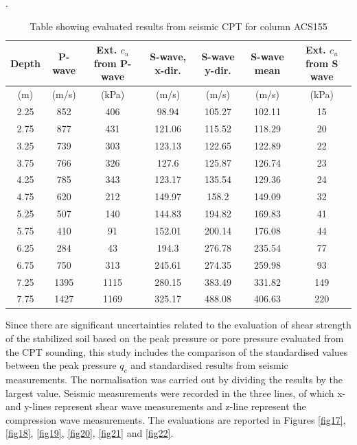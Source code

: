 \documentclass[final,3p,times,onecolumn,authoryear]{elsarticle}
\begin{document}
\begin{table}[t]
  \caption{Table showing evaluated results from seismic CPT for column ACS155}.
  \centering
  \begin{tabular}{| c c c c c c c |}                         
    Depth & P-wave & Ext. $c_u$ from P-wave & S-wave, x-dir. & S-wave y-dir. & S-wave mean & Ext. $c_u$ from S wave \\ \hline 
    (m) & (m/s) & (kPa) & (m/s) & (m/s) & (m/s) & (kPa) \\ \hline
    2.25 & 852 & 406 & 98.94 & 105.27 & 102.11 & 15 \\
    2.75 & 877 & 431 & 121.06 & 115.52 & 118.29 & 20 \\
    3.25 & 739 & 303 & 123.13 & 122.65 & 122.89 & 22 \\
    3.75 & 766 & 326 & 127.6 & 125.87 & 126.74 & 23 \\
    4.25 & 785 & 343 & 123.17 & 135.54 & 129.36 & 24 \\
    4.75 & 620 & 212 & 149.97 & 158.2 & 149.09 & 32 \\
    5.25 & 507 & 140 & 144.83 & 194.82 & 169.83 & 41 \\
    5.75 & 410 & 91 & 152.01 & 200.14 & 176.08 & 44 \\
    6.25 & 284 & 43 & 194.3 & 276.78 & 235.54 & 77 \\
    6.75 & 750 & 313 & 245.61 & 274.35 & 259.98 & 93 \\
    7.25 & 1395 & 1115 & 280.15 & 383.49 & 331.82 & 149 \\
    7.75 & 1427 & 1169 & 325.17 & 488.08 & 406.63 & 220
  \end{tabular}
  \label{tab:2}
\end{table}

Since there are significant uncertainties related to the evaluation of shear strength of the stabilized soil based on the peak pressure or pore pressure evaluated from the CPT sounding, this study includes the comparison of the standardised values between the peak pressure $q_c$ and standardised results from seismic measurements. The normalisation was carried out by dividing the results by the largest value. Seismic measurements were recorded in the three lines, of which x- and y-lines represent shear wave measurements and z-line represent the compression wave measurements. The evaluations are reported in Figures \ref{fig17}, \ref{fig18}, \ref{fig19}, \ref{fig20}, \ref{fig21} and \ref{fig22}.  
\end{document}
